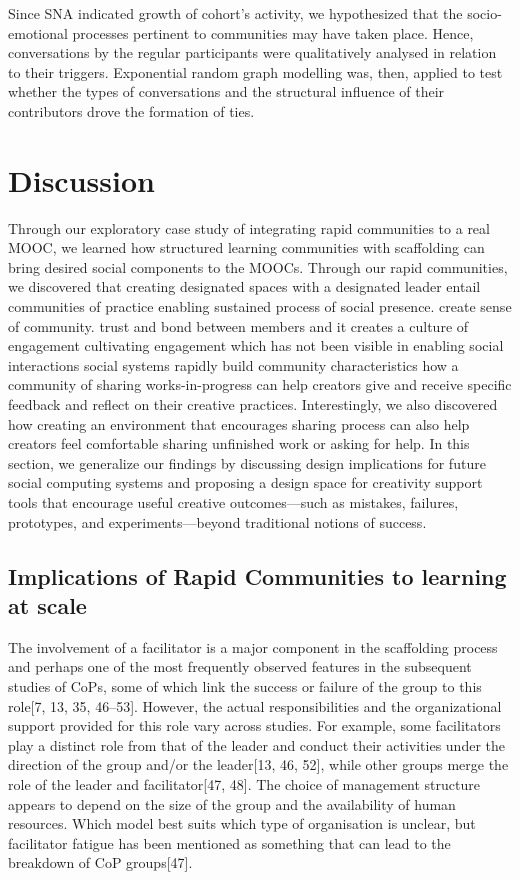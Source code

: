 \documentclass[manuscript,screen,review]{acmart}
\begin{document}
Since SNA indicated growth of cohort’s
activity, we hypothesized that the socio-emotional processes
pertinent to communities may have taken place. Hence,
conversations by the regular participants were qualitatively
analysed in relation to their triggers. Exponential random graph
modelling was, then, applied to test whether the types of
conversations and the structural influence of their contributors
drove the formation of ties. 

\section{Discussion}
Through our exploratory case study of integrating rapid communities to a real MOOC, we learned how structured learning communities with scaffolding can bring desired social components to the MOOCs. Through our rapid communities, we discovered that creating designated spaces with a designated leader entail communities of practice enabling sustained process of social presence.  create sense of community. trust and bond between members and it creates a culture of engagement  cultivating engagement which has not been visible in enabling social interactions   social systems rapidly build community characteristics 
how a community of sharing works-in-progress can help creators give and receive specific feedback and reflect on their
creative practices. Interestingly, we also discovered how creating an environment that encourages sharing process can
also help creators feel comfortable sharing unfinished work
or asking for help. In this section, we generalize our findings
by discussing design implications for future social computing systems and proposing a design space for creativity support tools that encourage useful creative outcomes—such as
mistakes, failures, prototypes, and experiments—beyond traditional notions of success.

\subsection{Implications of Rapid Communities to learning at scale}


The involvement of a facilitator is a major component in the scaffolding process and perhaps one of the most frequently observed features in the subsequent studies of CoPs, some of which link the success or failure of the group to this role[7, 13, 35, 46–53].  However, the actual responsibilities and the organizational support provided for this role vary across studies. For example, some facilitators play a distinct role from that of the leader and conduct their activities under the direction of the group and/or the leader[13, 46, 52], while other groups merge the role of the leader and facilitator[47, 48]. The choice of management structure appears to depend on the size of the group and the availability of human resources. Which model best suits which type of organisation is unclear, but facilitator fatigue has been mentioned as something that can lead to the breakdown of CoP groups[47].
\end{document}
